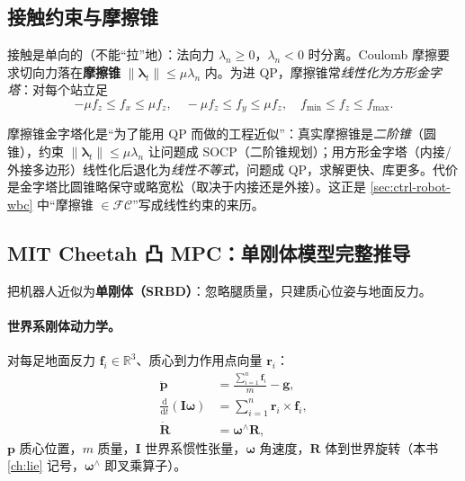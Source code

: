 \subsection{接触约束与摩擦锥}
\label{sec:ctrl-legged-contact}

接触是单向的（不能“拉”地）：法向力 $\lambda_n\ge0$，$\lambda_n<0$ 时分离。Coulomb 摩擦要求切向力落在\textbf{摩擦锥} $\|\boldsymbol{\lambda}_t\|\le\mu\lambda_n$ 内。为进 QP，摩擦锥常\emph{线性化为方形金字塔}\cite{dicarlo2018cheetah}：对每个站立足
\begin{equation}
  -\mu f_z\le f_x\le\mu f_z,\quad -\mu f_z\le f_y\le\mu f_z,\quad f_{\min}\le f_z\le f_{\max}.
  \label{eq:ctrl-friction-pyramid}
\end{equation}

\begin{insight}
摩擦锥金字塔化是“为了能用 QP 而做的工程近似”：真实摩擦锥是\emph{二阶锥}（圆锥），约束 $\|\boldsymbol{\lambda}_t\|\le\mu\lambda_n$ 让问题成 SOCP（二阶锥规划）；用方形金字塔（内接/外接多边形）线性化后退化为\emph{线性不等式}，问题成 QP，求解更快、库更多。代价是金字塔比圆锥略保守或略宽松（取决于内接还是外接）。这正是 \cref{sec:ctrl-robot-wbc} 中“摩擦锥 $\in\mathcal{FC}$”写成线性约束的来历。
\end{insight}

\subsection{MIT Cheetah 凸 MPC：单刚体模型完整推导}
\label{sec:ctrl-legged-cheetah}

 把机器人近似为\textbf{单刚体（SRBD）}：忽略腿质量，只建质心位姿与地面反力。

\paragraph{世界系刚体动力学。}
对每足地面反力 $\mathbf{f}_i\in\mathbb{R}^3$、质心到力作用点向量 $\mathbf{r}_i$\cite{dicarlo2018cheetah}：
\begin{align}
  \ddot{\mathbf{p}}&=\frac{\sum_{i=1}^n\mathbf{f}_i}{m}-\mathbf{g},\label{eq:ctrl-srbd-trans}\\
  \frac{\mathrm d}{\mathrm dt}(\mathbf{I}\boldsymbol{\omega})&=\sum_{i=1}^n\mathbf{r}_i\times\mathbf{f}_i,\label{eq:ctrl-srbd-rot}\\
  \dot{\mathbf{R}}&=\boldsymbol{\omega}^\wedge\mathbf{R},\label{eq:ctrl-srbd-R}
\end{align}
$\mathbf{p}$ 质心位置，$m$ 质量，$\mathbf{I}$ 世界系惯性张量，$\boldsymbol{\omega}$ 角速度，$\mathbf{R}$ 体到世界旋转（本书 \cref{ch:lie} 记号，$\boldsymbol{\omega}^\wedge$ 即叉乘算子）。

